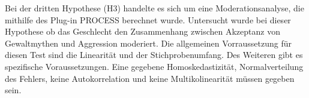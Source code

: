 Bei der dritten Hypothese (H3) handelte es sich um eine Moderationsanalyse, die mithilfe des Plug-in PROCESS berechnet wurde. Untersucht wurde bei dieser Hypothese ob das Geschlecht den Zusammenhang zwischen Akzeptanz von Gewaltmythen und Aggression moderiert. Die allgemeinen Vorraussetzung für diesen Test sind die Linearität und der Stichprobenumfang. Des Weiteren gibt es spezifische Voraussetzungen. Eine gegebene Homoskedastizität, Normalverteilung des Fehlers, keine Autokorrelation und keine Multikolinearität müssen gegeben sein.